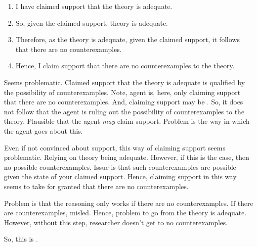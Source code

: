 \begin{note}
\begin{illustration}
    \begin{enumerate}
    \item I have claimed support that the theory is adequate.
    \item So, given the claimed support, theory is adequate.
    \item Therefore, as the theory is adequate, given the claimed support, it follows that there are no counterexamples.
    \item Hence, I claim support that there are no counterexamples to the theory.
    \end{enumerate}
    \vspace{-\baselineskip}
  \end{illustration}
\end{note}

\begin{note}
  Seems problematic.
  Claimed support that the theory is adequate is qualified by the possibility of counterexamples.
  {
    \color{red}
    Note, agent is, here, only claiming support that there are no counterexamples.
    And, claiming support may be \mom{}.
    So, it does not follow that the agent is ruling out the possibility of counterexamples to the theory.
    Plausible that the agent \emph{may} claim support.
    Problem is the way in which the agent goes about this.
  }

  {
    Even if not convinced about support, this way of claiming support seems problematic.
    Relying on theory being adequate.
    However, if this is the case, then no possible counterexamples.
    Issue is that such counterexamples are possible given the state of your claimed support.
    Hence, claiming support in this way seems to take for granted that there are no counterexamples.
  }

  Problem is that the reasoning only works if there are no counterexamples.
  If there are counterexamples, misled.
  Hence, problem to go from the theory is adequate.
  However, without this step, researcher doesn't get to no counterexamples.

  So, this is \eiS{}.
\end{note}

